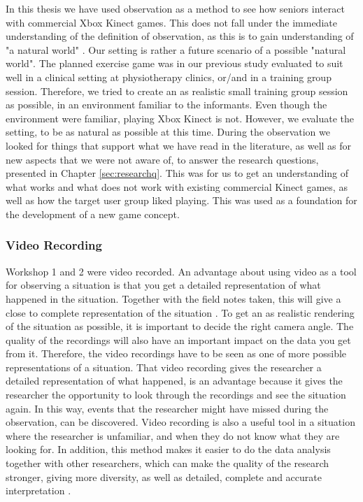 In this thesis we have used observation as a method to see how seniors interact with commercial Xbox Kinect games. This does not fall under the immediate understanding of the definition of observation, as this is to gain understanding of "a natural world" \cite{tjora}. Our setting is rather a future scenario of a possible "natural world". The planned exercise game was in our previous study \cite{project} evaluated to suit well in a clinical setting at physiotherapy clinics, or/and in a training group session. Therefore, we tried to create an as realistic small training group session as possible, in an environment familiar to the informants. Even though the environment were familiar, playing Xbox Kinect is not. However, we evaluate the setting, to be as natural as possible at this time. During the observation we looked for things that support what we have read in the literature, as well as for new aspects that we were not aware of, to answer the research questions, presented in Chapter \ref{sec:researchq}. This was for us to get an understanding of what works and what does not work with existing commercial Kinect games, as well as how the target user group liked playing. This was used as a foundation for the development of a new game concept. 

\subsubsection{Video Recording}
Workshop 1 and 2 were video recorded. An advantage about using video as a tool for observing a situation is that you get a detailed representation of what happened in the situation. Together with the field notes taken, this will give a close to complete representation of the situation \cite{tjora}. To get an as realistic rendering of the situation as possible, it is important to decide the right camera angle. The quality of the recordings will also have an important impact on the data you get from it. Therefore, the video recordings have to be seen as one of more possible representations of a situation.  That video recording gives the researcher a detailed representation of what happened, is an advantage because it gives the researcher the opportunity to look through the recordings and see the situation again. In this way, events that the researcher might have missed during the observation, can be discovered. Video recording is also a useful tool in a situation where the researcher is unfamiliar, and when they do not know what they are looking for. In addition, this method makes it easier to do the data analysis together with other researchers, which can make the quality of the research stronger, giving more diversity, as well as detailed, complete and accurate interpretation \cite{tjora}.


